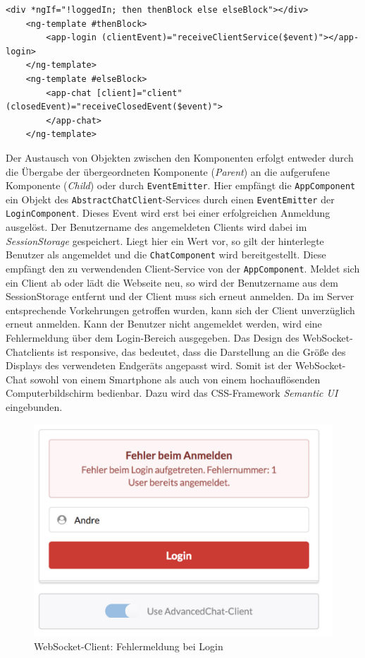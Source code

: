\documentclass[11pt,a4paper,titlepage]{scrartcl}
\numberwithin{equation}{section}
\begin{document}
\begin{lstlisting}[frame=single, caption=WebSocket-Client: AppComponent-View, label=lst:wsClientRoot]
	<div *ngIf="!loggedIn; then thenBlock else elseBlock"></div>
	<ng-template #thenBlock>
		<app-login (clientEvent)="receiveClientService($event)"></app-login>
	</ng-template>
	<ng-template #elseBlock>
		<app-chat [client]="client" (closedEvent)="receiveClosedEvent($event)">
		</app-chat>
	</ng-template>
\end{lstlisting}

\noindent Der Austausch von Objekten zwischen den Komponenten erfolgt entweder durch die Übergabe der übergeordneten Komponente (\textit{Parent}) an die aufgerufene Komponente (\textit{Child}) oder durch \texttt{EventEmitter}. Hier empfängt die \texttt{AppComponent} ein Objekt des \texttt{AbstractChatClient}-Services durch einen \texttt{EventEmitter} der \texttt{LoginComponent}. Dieses Event wird erst bei einer erfolgreichen Anmeldung ausgelöst. Der Benutzername des angemeldeten Clients wird dabei im \textit{SessionStorage} gespeichert. Liegt hier ein Wert vor, so gilt der hinterlegte Benutzer als angemeldet und die \texttt{ChatComponent} wird bereitgestellt. Diese empfängt den zu verwendenden Client-Service von der \texttt{AppComponent}. Meldet sich ein Client ab oder lädt die Webseite neu, so wird der Benutzername aus dem SessionStorage entfernt und der Client muss sich erneut anmelden. Da im Server entsprechende Vorkehrungen getroffen wurden, kann sich der Client unverzüglich erneut anmelden. Kann der Benutzer nicht angemeldet werden, wird eine Fehlermeldung über dem Login-Bereich ausgegeben. Das Design des WebSocket-Chatclients ist responsive, das bedeutet, dass die Darstellung an die Größe des Displays des verwendeten Endgeräts angepasst wird. Somit ist der WebSocket-Chat sowohl von einem Smartphone als auch von einem hochauflösenden Computerbildschirm bedienbar. Dazu wird das CSS-Framework \textit{Semantic UI} eingebunden.
\medskip
\begin{figure}[ht] 
	\begin{center}
		\includegraphics[scale=0.35]{img/LoginErrorView.pdf}
		\caption{WebSocket-Client: Fehlermeldung bei Login}
		\label{fig:errorLoginView}
	\end{center}
\end{figure}
\end{document}
